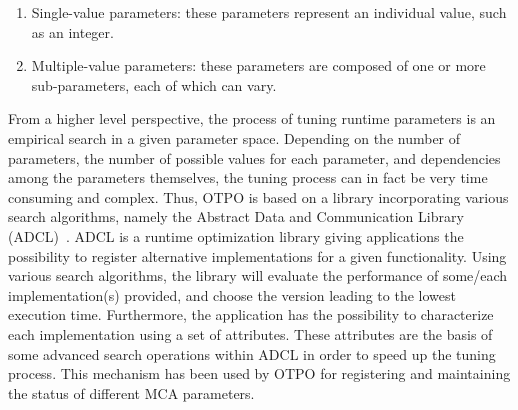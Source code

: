 \begin{enumerate}
\item Single-value parameters: these parameters represent an
  individual value, such as an integer.
\item Multiple-value parameters: these parameters are composed of
  one or more sub-parameters, each of which can vary.
\end{enumerate}

From a higher level perspective, the process of tuning runtime parameters is an empirical search in a given parameter space. Depending on the number of parameters, the number of possible values for each parameter, and dependencies among the parameters themselves, the tuning process can in fact be very time consuming and complex. Thus, OTPO is based on a library incorporating various search algorithms, namely the Abstract Data and Communication Library (ADCL)~\cite{ADCL}. ADCL is a runtime optimization library giving applications the possibility to register alternative implementations for a given functionality. Using various search algorithms, the library will evaluate the performance of some/each implementation(s) provided, and choose the version leading to the lowest execution time. Furthermore, the application has the possibility to characterize each implementation using a set of attributes. These attributes are the basis of some advanced search operations within ADCL in order to speed up the tuning process. This mechanism has been used by OTPO for registering and maintaining the status of different MCA parameters. 